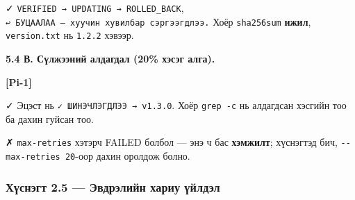 ✓ \texttt{VERIFIED\ →\ UPDATING\ →\ ROLLED\_\allowbreak{}BACK}, \texttt{↩\ БУЦААЛАА\ —\ хуучин\ хувилбар\ сэргээгдлээ.\allowbreak{}} Хоёр \texttt{sha256sum} \textbf{ижил}, \texttt{version.txt} нь \texttt{1.2.2} хэвээр.

\textbf{5.4 В. Сүлжээний алдагдал (20\% хэсэг алга).}

\textbf{{[}Pi-1{]}}

\begin{Shaded}
\begin{Highlighting}[]
 \KeywordTok{\textbackslash{}}
    \KeywordTok{|} 
\end{Highlighting}
\end{Shaded}

✓ Эцэст нь \texttt{✓\ ШИНЭЧЛЭГДЛЭЭ\ →\ v1.\allowbreak{}3.\allowbreak{}0}. Хоёр \texttt{grep\ -c} нь алдагдсан хэсгийн тоо ба дахин гуйсан тоо.

✗ \texttt{max-retries} хэтэрч FAILED болбол --- энэ ч бас \textbf{хэмжилт}; хүснэгтэд бич, \texttt{-\/\allowbreak{}-max-retries\ 20}-оор дахин оролдож болно.

\hypertarget{ux445ux4afux441ux43dux44dux433ux442-2.5-ux44dux432ux434ux440ux44dux43bux438ux439ux43d-ux445ux430ux440ux438ux443-ux4afux439ux43bux434ux44dux43b}{%
\subsubsection{Хүснэгт 2.5 --- Эвдрэлийн хариу үйлдэл}\label{ux445ux4afux441ux43dux44dux433ux442-2.5-ux44dux432ux434ux440ux44dux43bux438ux439ux43d-ux445ux430ux440ux438ux443-ux4afux439ux43bux434ux44dux43b}}

